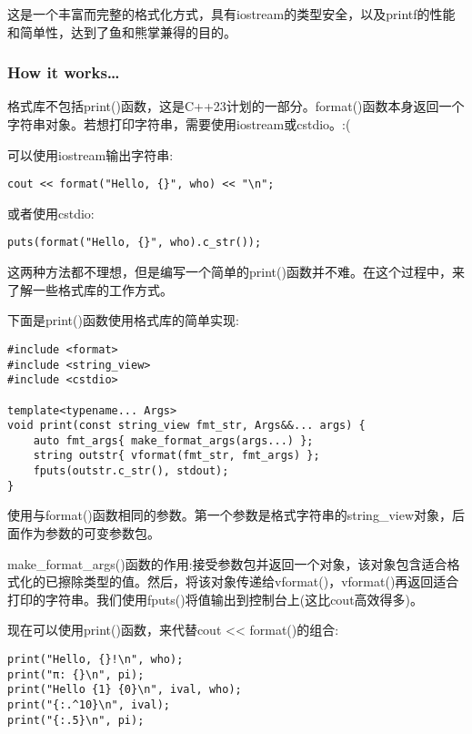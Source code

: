 这是一个丰富而完整的格式化方式，具有iostream的类型安全，以及printf的性能和简单性，达到了鱼和熊掌兼得的目的。

\subsubsection{How it works…}

格式库不包括print()函数，这是C++23计划的一部分。format()函数本身返回一个字符串对象。若想打印字符串，需要使用iostream或cstdio。:(

可以使用iostream输出字符串:

\begin{lstlisting}[style=styleCXX]
cout << format("Hello, {}", who) << "\n";
\end{lstlisting}

或者使用cstdio:

\begin{lstlisting}[style=styleCXX]
puts(format("Hello, {}", who).c_str());
\end{lstlisting}

这两种方法都不理想，但是编写一个简单的print()函数并不难。在这个过程中，来了解一些格式库的工作方式。

下面是print()函数使用格式库的简单实现:

\begin{lstlisting}[style=styleCXX]
#include <format>
#include <string_view>
#include <cstdio>

template<typename... Args>
void print(const string_view fmt_str, Args&&... args) {
	auto fmt_args{ make_format_args(args...) };
	string outstr{ vformat(fmt_str, fmt_args) };
	fputs(outstr.c_str(), stdout);
}
\end{lstlisting}

使用与format()函数相同的参数。第一个参数是格式字符串的string\_view对象，后面作为参数的可变参数包。

make\_format\_args()函数的作用:接受参数包并返回一个对象，该对象包含适合格式化的已擦除类型的值。然后，将该对象传递给vformat()，vformat()再返回适合打印的字符串。我们使用fputs()将值输出到控制台上(这比cout高效得多)。

现在可以使用print()函数，来代替cout <{}< format()的组合:

\begin{lstlisting}[style=styleCXX]
print("Hello, {}!\n", who);
print("π: {}\n", pi);
print("Hello {1} {0}\n", ival, who);
print("{:.^10}\n", ival);
print("{:.5}\n", pi);
\end{lstlisting}

